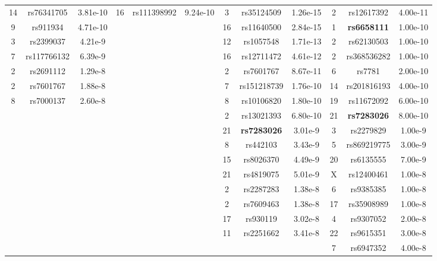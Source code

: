 \begin{table}[H]
\begin{adjustwidth}{-3 cm}{-2.5 cm}
\begin{threeparttable}[!htb]
\begin{tabular}{ccc||ccc||ccc||ccc}
			14 &rs76341705 &3.81e-10 &16 &rs111398992 &9.24e-10 &3 &rs35124509 &1.26e-15 &2 &rs12617392 &4.00e-11 \\
			9 &rs911934 &4.71e-10 & & & &16 &rs11640500 &2.84e-15 &1 &\textbf{rs6658111} &1.00e-10 \\
			3 &rs2399037 &4.21e-9 & & & &12 &rs1057548 &1.71e-13 &2 &rs62130503 &1.00e-10 \\
			7 &rs117766132 &6.39e-9 & & & &16 &rs12711472 &4.61e-12 &2 &rs368536282 &1.00e-10 \\
			\cellcolor[HTML]{C8C8C8}2 &\cellcolor[HTML]{C8C8C8}rs2691112 &\cellcolor[HTML]{C8C8C8}1.29e-8 & & & &2 &rs7601767 &8.67e-11 &6 &rs7781 &2.00e-10 \\
			\cellcolor[HTML]{C8C8C8}2 &\cellcolor[HTML]{C8C8C8}rs7601767 &\cellcolor[HTML]{C8C8C8}1.88e-8 & & & &7 &rs151218739 &1.76e-10 &14 &rs201816193 &4.00e-10 \\
			\cellcolor[HTML]{C8C8C8}8 &\cellcolor[HTML]{C8C8C8}rs7000137 &\cellcolor[HTML]{C8C8C8}2.60e-8 & & & &8 &rs10106820 &1.80e-10 &19 &rs11672092 &6.00e-10 \\
			& & & & & &2 &rs13021393 &6.80e-10 &21 &\textbf{rs7283026} &8.00e-10 \\
			& & & & & &21 &\textbf{rs7283026} &3.01e-9 &3 &rs2279829 &1.00e-9 \\
			& & & & & &8 &rs442103 &3.43e-9 &5 &rs869219775 &3.00e-9 \\
			& & & & & &15 &rs8026370 &4.49e-9 &20 &rs6135555 &7.00e-9 \\
			& & & & & &21 &rs4819075 &5.01e-9 &\cellcolor[HTML]{C8C8C8}X &\cellcolor[HTML]{C8C8C8}rs12400461 &\cellcolor[HTML]{C8C8C8}1.00e-8 \\
			& & & & & &\cellcolor[HTML]{C8C8C8}2 &\cellcolor[HTML]{C8C8C8}rs2287283 &\cellcolor[HTML]{C8C8C8}1.38e-8 &\cellcolor[HTML]{C8C8C8}6 &\cellcolor[HTML]{C8C8C8}rs9385385 &\cellcolor[HTML]{C8C8C8}1.00e-8 \\
			& & & & & &\cellcolor[HTML]{C8C8C8}2 &\cellcolor[HTML]{C8C8C8}rs7609463 &\cellcolor[HTML]{C8C8C8}1.38e-8 &\cellcolor[HTML]{C8C8C8}17 &\cellcolor[HTML]{C8C8C8}rs35908989 &\cellcolor[HTML]{C8C8C8}1.00e-8 \\
			& & & & & &\cellcolor[HTML]{C8C8C8}17 &\cellcolor[HTML]{C8C8C8}rs930119 &\cellcolor[HTML]{C8C8C8}3.02e-8 &\cellcolor[HTML]{C8C8C8}4 &\cellcolor[HTML]{C8C8C8}rs9307052 &\cellcolor[HTML]{C8C8C8}2.00e-8 \\
			& & & & & &\cellcolor[HTML]{C8C8C8}11 &\cellcolor[HTML]{C8C8C8}rs2251662 &\cellcolor[HTML]{C8C8C8}3.41e-8 &\cellcolor[HTML]{C8C8C8}22 &\cellcolor[HTML]{C8C8C8}rs9615351 &\cellcolor[HTML]{C8C8C8}3.00e-8 \\
			& & & & & & & & &\cellcolor[HTML]{C8C8C8}7 &\cellcolor[HTML]{C8C8C8}rs6947352 &\cellcolor[HTML]{C8C8C8}4.00e-8 \\
			\bottomrule
		\end{tabular}
		

\end{threeparttable}
\end{adjustwidth}
\end{table}
